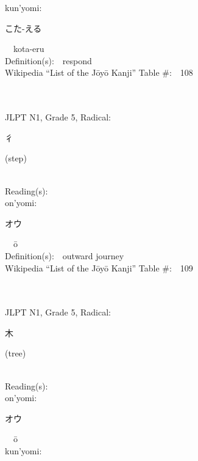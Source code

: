 \begin{multicols}{2}
{\hspace*{1em}}kun'yomi:\ \ \\
{\hspace*{2em}}{\begin{CJK}{UTF8}{min} こた-える \end{CJK}}\ \ kota-eru\ \ \\
Definition(s):\ \ respond \\
Wikipedia ``List of the J\=oy\=o Kanji'' Table \#:\ \ 108 \\
\ \ \\
{\fontsize{34pt}{40pt}  }\ \ \\  %
{JLPT N1, Grade 5, Radical:\ \ {\begin{CJK}{UTF8}{min} 彳 \end{CJK}} (step) } \\
Reading(s):\ \ \\
{\hspace*{1em}}on'yomi:\ \ \\
{\hspace*{2em}}{\begin{CJK}{UTF8}{min} オウ \end{CJK}}\ \ \=o\ \ \\
Definition(s):\ \ outward journey \\
Wikipedia ``List of the J\=oy\=o Kanji'' Table \#:\ \ 109 \\
\ \ \\
{\fontsize{34pt}{40pt}  }\ \ \\  %
{JLPT N1, Grade 5, Radical:\ \ {\begin{CJK}{UTF8}{min} 木 \end{CJK}} (tree) } \\
Reading(s):\ \ \\
{\hspace*{1em}}on'yomi:\ \ \\
{\hspace*{2em}}{\begin{CJK}{UTF8}{min} オウ \end{CJK}}\ \ \=o\ \ \\
{\hspace*{1em}}kun'yomi:\ \ \\

\end{multicols}
